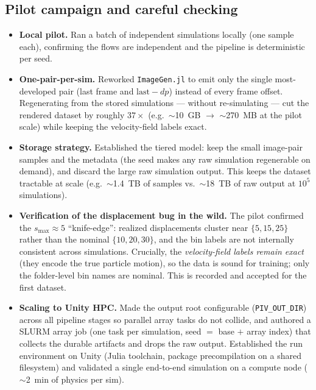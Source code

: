 \documentclass[11pt]{article}
\newcommand{\code}[1]{\texttt{\small #1}}
\begin{document}
\subsection{Pilot campaign and careful checking}
\begin{itemize}
  \item \textbf{Local pilot.} Ran a batch of independent simulations locally
        (one sample each), confirming the flows are independent and the pipeline is
        deterministic per seed.
  \item \textbf{One-pair-per-sim.} Reworked \code{ImageGen.jl} to emit only the
        single most-developed pair (last frame and $\text{last}-dp$) instead of
        every frame offset. Regenerating from the stored simulations --- without
        re-simulating --- cut the rendered dataset by roughly $37\times$
        (e.g.\ $\sim$10~GB $\rightarrow$ $\sim$270~MB at the pilot scale) while
        keeping the velocity-field labels exact.
  \item \textbf{Storage strategy.} Established the tiered model: keep the small
        image-pair samples and the metadata (the seed makes any raw simulation
        regenerable on demand), and discard the large raw simulation output. This
        keeps the dataset tractable at scale (e.g.\ $\sim$1.4~TB of samples vs.\
        $\sim$18~TB of raw output at $10^5$ simulations).
  \item \textbf{Verification of the displacement bug in the wild.} The pilot
        confirmed the $s_{\max}\!\approx\!5$ ``knife-edge'': realized displacements
        cluster near $\{5,15,25\}$ rather than the nominal $\{10,20,30\}$, and the
        bin labels are not internally consistent across simulations. Crucially, the
        \emph{velocity-field labels remain exact} (they encode the true particle
        motion), so the data is sound for training; only the folder-level bin names
        are nominal. This is recorded and accepted for the first dataset.
  \item \textbf{Scaling to Unity HPC.} Made the output root configurable
        (\code{PIV\_OUT\_DIR}) across all pipeline stages so parallel array tasks do
        not collide, and authored a SLURM array job (one task per simulation,
        seed $=$ base $+$ array index) that collects the durable artifacts and drops
        the raw output. Established the run environment on Unity (Julia toolchain,
        package precompilation on a shared filesystem) and validated a single
        end-to-end simulation on a compute node ($\sim$2~min of physics per sim).
\end{itemize}
\end{document}
